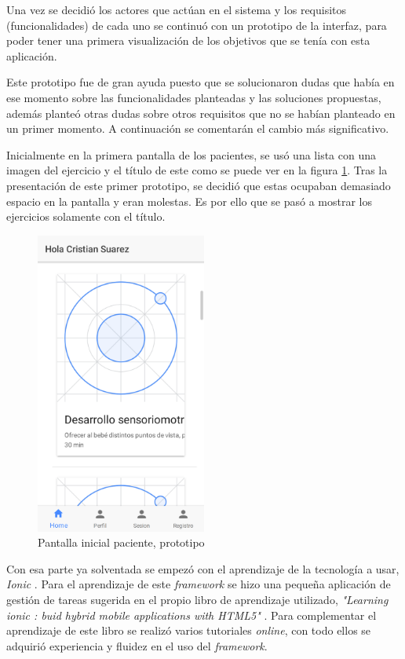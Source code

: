 \medskip
Una vez se decidió los actores que actúan en el sistema y los requisitos (funcionalidades) de cada uno
se continuó con un prototipo de la interfaz, para poder tener una primera visualización de los objetivos
que se tenía con esta aplicación.

\medskip
Este prototipo fue de gran ayuda puesto que se solucionaron dudas que había en ese momento sobre
las funcionalidades planteadas y las soluciones propuestas, además planteó otras dudas sobre otros requisitos
que no se habían planteado en un primer momento. A continuación se comentarán el cambio más significativo.

\medskip
Inicialmente en la primera pantalla de los pacientes, se usó una lista con una imagen del ejercicio y el
título de este como se puede ver en la figura \ref{patient-home-v1}. Tras la presentación de este primer prototipo,
se decidió que estas ocupaban demasiado espacio en la pantalla y eran molestas. Es por ello que se pasó a mostrar los
ejercicios solamente con el título.

\begin{figure}[!h]
    \centering
    \includegraphics[width=0.5\textwidth]{images/screenshots/patient-home-v1.png}
    \caption{Pantalla inicial paciente, prototipo}
    \label{patient-home-v1}
\end{figure}


\medskip
Con esa parte ya solventada se empezó con el aprendizaje de la tecnología a usar, \textit{Ionic} \cite{ionic}.
Para el aprendizaje de este \textit{framework} se hizo una pequeña aplicación de gestión de tareas
sugerida en el propio libro de aprendizaje utilizado, \textit{"Learning ionic : buid hybrid mobile
applications with HTML5"} \cite{ionic-book}. Para complementar el aprendizaje de este libro se realizó
varios tutoriales \textit{online}, con todo ellos se adquirió experiencia y fluidez en el uso del
\textit{framework}.

